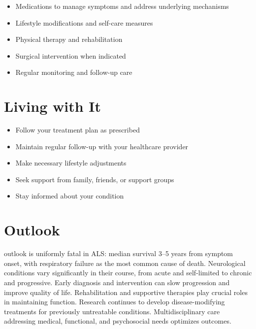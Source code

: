 \begin{itemize}[noitemsep]
  \item Medications to manage symptoms and address underlying mechanisms
  \item Lifestyle modifications and self-care measures
  \item Physical therapy and rehabilitation
  \item Surgical intervention when indicated
  \item Regular monitoring and follow-up care
\end{itemize}
\section{Living with It}
\begin{itemize}[noitemsep]
  \item Follow your treatment plan as prescribed
  \item Maintain regular follow-up with your healthcare provider
  \item Make necessary lifestyle adjustments
  \item Seek support from family, friends, or support groups
  \item Stay informed about your condition
\end{itemize}
\section{Outlook}
outlook is uniformly fatal in ALS: median survival 3--5 years from symptom onset, with respiratory failure as the most common cause of death. Neurological conditions vary significantly in their course, from acute and self-limited to chronic and progressive. Early diagnosis and intervention can slow progression and improve quality of life. Rehabilitation and supportive therapies play crucial roles in maintaining function. Research continues to develop disease-modifying treatments for previously untreatable conditions. Multidisciplinary care addressing medical, functional, and psychosocial needs optimizes outcomes.
